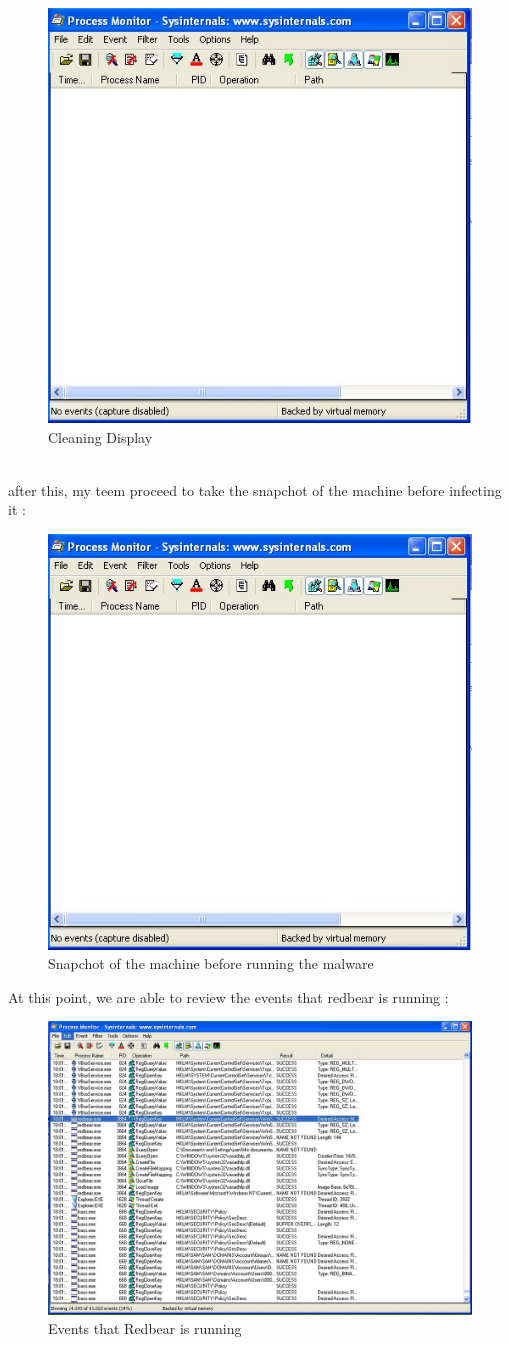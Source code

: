 \documentclass[10pt,a4paper]{article} %
\begin{document}
        \\
        \begin{figure}[h!]
            \centering
            \includegraphics[width=0.4\linewidth]{fig3.jpeg}
            \caption{Cleaning Display}
            \label{3}
        \end{figure}
        \\ after this, my teem proceed to take the snapchot of  the machine
        before infecting it :
        \\
        \begin{figure}[h]
            \centering
            \includegraphics[width=0.4\linewidth]{fig3}
            \caption{Snapchot of the machine before running the malware}
            \label{4}
        \end{figure}
        \newpage
        At this point, we are able to review the events that redbear is
        running :
        \\
        \begin{figure}[h!]
            \centering
            \includegraphics[width=0.8\linewidth]{fig5}
            \caption{Events that Redbear is running}
            \label{5}
        \end{figure}
\end{document}

